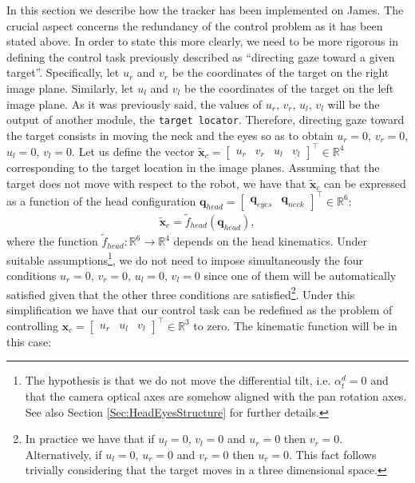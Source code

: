 In this section we describe how the tracker has been implemented on James. The crucial aspect concerns the redundancy of the control problem as it has been stated above. In order to state this more clearly, we need to be more rigorous in defining the control task previously described as ``directing gaze toward a given target''. Specifically, let $u_r$ and $v_r$ be the coordinates of the target on the right image plane. Similarly, let $u_l$ and $v_l$ be the coordinates of the target on the left image plane. As it was previously said, the values of $u_r$, $v_r$, $u_l$, $v_l$ will be the output of another module, the {\tt target locator}. Therefore, directing gaze toward the target consists in moving the neck and the eyes so as to obtain $u_r=0$, $v_r=0$, $u_l=0$, $v_l=0$. Let us define the vector $\tilde {\mathbf x}_c= \begin{bmatrix} u_r & v_r & u_l & v_l \end{bmatrix}^\top \in \mathbb R^4$ corresponding to the target location in the image planes. Assuming that the target does not move with respect to the robot, we have that $\tilde {\mathbf x}_c$ can be expressed as a function of the head configuration $\mathbf q_{head} = \begin{bmatrix} \mathbf q_{eyes} & \mathbf q_{neck} \end{bmatrix}^\top \in \mathbb R^6$:
\begin{eqnarray*}
\tilde {\mathbf x}_c = \tilde f_{head} (\mathbf q_{head}),
\end{eqnarray*}
where the function $\tilde f_{head} : \mathbb R^6 \longrightarrow \mathbb R^4$ depends on the head kinematics. Under suitable assumptions\footnote{The hypothesis is that we do not move the differential tilt, i.e. $\alpha_t^d = 0$ and that the camera optical axes are somehow aligned with the pan rotation axes. See also Section \ref{Sec:HeadEyesStructure} for further details.}, we do not need to impose simultaneously the four conditions $u_r=0$, $v_r=0$, $u_l=0$, $v_l=0$ since one of them will be automatically satisfied given that the other three conditions are satisfied\footnote{In practice we have that if $u_l=0$, $v_l=0$ and $u_r=0$ then $v_r=0$. Alternatively, if $u_l=0$, $u_r=0$ and $v_r=0$ then $u_r=0$. This fact follows trivially considering that the target moves in a three dimensional space.}. Under this simplification we have that our control task can be redefined as the problem of controlling ${\mathbf x}_c= \begin{bmatrix} u_r & u_l & v_l \end{bmatrix}^\top \in \mathbb R^3$ to zero. The kinematic function will be in this case:
